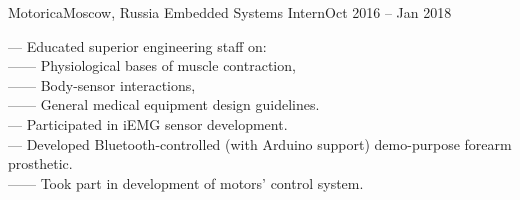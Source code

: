     \resumeSubheading
      {Motorica}{Moscow, Russia}
      {Embedded Systems Intern}{Oct 2016 -- Jan 2018}
      \begin{itemize}[leftmargin=0in, label={}]
            \small{\item{
                {— Educated superior engineering staff on:}\\
                {—— Physiological bases of muscle contraction,}\\
                {—— Body-sensor interactions,}\\
                {—— General medical equipment design guidelines.}\\
                {— Participated in iEMG sensor development.}\\
                {— Developed Bluetooth-controlled (with Arduino support) demo-purpose forearm prosthetic.}\\
                {—— Took part in development of motors' control system.}
            }}
      \end{itemize}